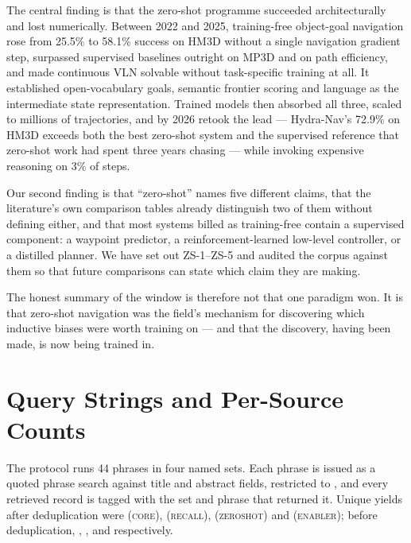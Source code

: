 \documentclass[journal]{IEEEtran}
\begin{document}
The central finding is that the zero-shot programme succeeded
architecturally and lost numerically. Between 2022 and 2025, training-free
object-goal navigation rose from 25.5\% to 58.1\% success on HM3D without a
single navigation gradient step, surpassed supervised baselines outright on
MP3D and on path efficiency, and made continuous VLN solvable without
task-specific training at all. It established open-vocabulary goals,
semantic frontier scoring and language as the intermediate state
representation. Trained models then absorbed all three, scaled to millions
of trajectories, and by 2026 retook the lead --- Hydra-Nav's 72.9\% on
HM3D exceeds both the best zero-shot system and the supervised reference
that zero-shot work had spent three years chasing --- while invoking
expensive reasoning on 3\% of steps.

Our second finding is that ``zero-shot'' names five different claims, that
the literature's own comparison tables already distinguish two of them
without defining either, and that most systems billed as training-free
contain a supervised component: a waypoint predictor, a
reinforcement-learned low-level controller, or a distilled planner. We have set out
ZS-1--ZS-5 and audited the corpus against them so that future comparisons
can state which claim they are making.

The honest summary of the window is therefore not that one paradigm won. It
is that zero-shot navigation was the field's mechanism for discovering which
inductive biases were worth training on --- and that the discovery, having
been made, is now being trained in.

\appendices
\section{Query Strings and Per-Source Counts}\label{app:queries}
The protocol runs 44 phrases in four named sets. Each phrase is issued as a
quoted phrase search against title and abstract fields, restricted to
\HarvestWindow{}, and every retrieved record is tagged with the set and
phrase that returned it. Unique yields after deduplication were
\SetCore{} (\textsc{core}), \SetRecall{} (\textsc{recall}),
\SetZeroshot{} (\textsc{zeroshot}) and \SetEnabler{} (\textsc{enabler});
before deduplication, \SetRawCore{}, \SetRawRecall{}, \SetRawZeroshot{} and
\SetRawEnabler{} respectively.


\end{document}
